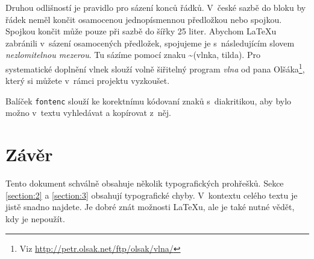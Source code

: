 \documentclass[twocolumn, 10pt, a4paper]{article}
\begin{document}
    Druhou odlišností je pravidlo pro sázení konců řádků.
    V~české sazbě do bloku by řádek neměl končit osamocenou jednopísmennou předložkou nebo spojkou.
    Spojkou  končit může pouze při sazbě do šířky 25 liter.
    Abychom \LaTeX{u} zabránili v~sázení osamocených předložek, spojujeme je s~následujícím slovem \textit{nezlomitelnou mezerou}.
    Tu sázíme pomocí znaku \textasciitilde (vlnka, tilda).
    Pro systematické do\-plnění vlnek slouží volně šiřitelný program \textit{vlna} od pana Olšáka\footnote{Viz \url{http://petr.olsak.net/ftp/olsak/vlna/}}, který si můžete v~rámci projektu vyzkoušet.
    
    Balíček \texttt{fontenc} slouží ke korektnímu kódovaní znaků s~diakritikou, aby bylo možno v~textu vyhledávat a kopírovat z~něj.


\section{Závěr}
    Tento dokument schválně obsahuje několik typografických prohřešků.
    Sekce \ref{section:2} a \ref{section:3} obsahují typografické chyby.
    V~kontextu celého textu je jistě snadno najdete.
    Je dobré znát možnosti \LaTeX{u}, ale je také nutné vědět, kdy je nepoužít.
\end{document}
